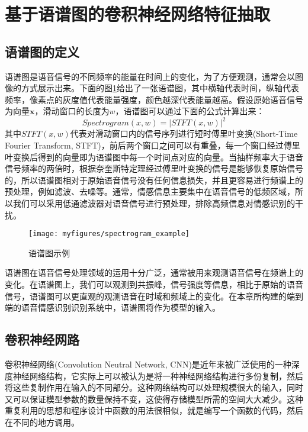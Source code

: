 \section{基于语谱图的卷积神经网络特征抽取}
\label{sec:cnn_spectrogram_feature}

\subsection{语谱图的定义}
\label{ssec:spectrogram}

语谱图是语音信号的不同频率的能量在时间上的变化，为了方便观测，通常会以图像的方式展示出来。下面的图\ref{fig:spectrogram_example}给出了一张语谱图，其中横轴代表时间，纵轴代表频率，像素点的灰度值代表能量强度，颜色越深代表能量越高。假设原始语音信号为向量$\mathbf{x}$，滑动窗口的长度为$w$，语谱图可以通过下面的公式计算出来：
\begin{equation}
\label{equ:spectrogram}
    Spectrogram(x, w) = |STFT(x, w)|^2
\end{equation}
其中$STFT(x, w)$代表对滑动窗口内的信号序列进行短时傅里叶变换(Short-Time Fourier Transform, STFT)，前后两个窗口之间可以有重叠，每一个窗口经过傅里叶变换后得到的向量即为语谱图中每一个时间点对应的向量。当抽样频率大于语音信号频率的两倍时，根据奈奎斯特定理经过傅里叶变换的信号是能够恢复原始信号的，所以语谱图相对于原始语音信号没有任何信息损失，并且更容易进行频谱上的预处理，例如滤波、去噪等。通常，情感信息主要集中在语音信号的低频区域，所以我们可以采用低通滤波器对语音信号进行预处理，排除高频信息对情感识别的干扰。

\begin{figure}[htb] %
    \centering
    \texttt{[image: myfigures/spectrogram\_example]}
    \caption{语谱图示例}
    \label{fig:spectrogram_example}
\end{figure}

语谱图在语音信号处理领域的运用十分广泛，通常被用来观测语音信号在频谱上的变化。在语谱图上，我们可以观测到共振峰，信号强度等信息，相比于原始的语音信号，语谱图可以更直观的观测语音在时域和频域上的变化。在本章所构建的端到端的语音情感识别识别系统中，语谱图将作为模型的输入。

\subsection{卷积神经网路}
\label{ssec:cnn}

卷积神经网络(Convolution Neutral Network, CNN)是近年来被广泛使用的一种深度神经网络结构，它实际上可以被认为是将一种神经网络结构进行多份复制，然后将这些复制作用在输入的不同部分。这种网络结构可以处理规模很大的输入，同时又可以保证模型参数的数量保持不变，这使得存储模型所需的空间大大减少。这种重复利用的思想和程序设计中函数的用法很相似，就是编写一个函数的代码，然后在不同的地方调用。

